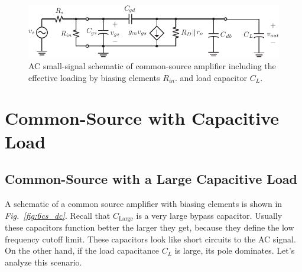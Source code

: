 \begin{figure}[H]
\centering
\includegraphics[scale=1.20]{7cs_cL_ss}
\caption{AC small-signal schematic of common-source amplifier including the effective loading by biasing elements $R_{in}$. and load capacitor $C_L$.}
\label{fig:7cs_cL_ss}
\end{figure}
\section{Common-Source with Capacitive Load}
\subsection{Common-Source with a Large Capacitive Load}
A schematic of a common source amplifier with biasing elements is shown in \emph{Fig.~\ref{fig:6cs_dc}}. Recall that $C_{\text{Large}}$ is a very large bypass capacitor.  Usually these capacitors function better the larger they get, because they define the low frequency cutoff limit.  These capacitors look like short circuits to the AC signal.  On the other hand, if the load capacitance $C_L$ is large, its pole dominates. Let's analyze this scenario.

